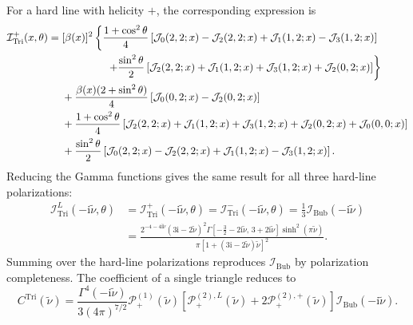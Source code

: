 \documentclass[a4paper,12pt]{article}
\def\ii{\mathrm{i}}
\begin{document}
For a hard line with helicity $+$, the corresponding expression is
\begin{align}
    \mathcal I^+_{\mathrm{Tri}}(x,\theta)
    ={}&[\beta(x)]^2\left\{
    \frac{1+\cos^2\theta}{4}\left[
    \mathcal J_0(2,2;x)-\mathcal J_2(2,2;x)
    +\mathcal J_1(1,2;x)-\mathcal J_3(1,2;x)\right]\right.
    \nonumber\\
    &\hspace{15mm}\left.+\frac{\sin^2\theta}{2}\left[
    \mathcal J_2(2,2;x)+\mathcal J_1(1,2;x)
    +\mathcal J_3(1,2;x)+\mathcal J_2(0,2;x)\right]\right\}
    \nonumber\\
    &+\frac{\beta(x)(2+\sin^2\theta)}4
    \left[\mathcal J_0(0,2;x)-\mathcal J_2(0,2;x)\right]
    \nonumber\\
    &+\frac{1+\cos^2\theta}{4}\left[
    \mathcal J_2(2,2;x)+\mathcal J_1(1,2;x)
    +\mathcal J_3(1,2;x)+\mathcal J_2(0,2;x)
    +\mathcal J_0(0,0;x)\right]
    \nonumber\\
    &+\frac{\sin^2\theta}{2}\left[
    \mathcal J_0(2,2;x)-\mathcal J_2(2,2;x)
    +\mathcal J_1(1,2;x)-\mathcal J_3(1,2;x)\right].
    \label{eq:triangle-IP-explicit}
\end{align}
Reducing the Gamma functions gives the same result for all three hard-line polarizations:
\begin{align}
    \mathcal I^L_{\mathrm{Tri}}(-\ii\tilde\nu,\theta)
    &=\mathcal I^+_{\mathrm{Tri}}(-\ii\tilde\nu,\theta)
    =\mathcal I^-_{\mathrm{Tri}}(-\ii\tilde\nu,\theta)
    =\frac13\mathcal I_{\mathrm{Bub}}(-\ii\tilde\nu)
    \nonumber\\
    &=\frac{2^{-4-4\ii\tilde\nu}(3\ii-2\tilde\nu)^2
    \Gamma[-\tfrac32-2\ii\tilde\nu,\,3+2\ii\tilde\nu]
    \sinh^2(\pi\tilde\nu)}
    {\pi[1+(3\ii-2\tilde\nu)\tilde\nu]^2}.
    \label{eq:triangle-I-closed}
\end{align}
Summing over the hard-line polarizations reproduces $\mathcal I_{\mathrm{Bub}}$ by polarization completeness.
The coefficient of a single triangle reduces to
\begin{equation}
    C^{\mathrm{Tri}}(\tilde\nu)
    =\frac{\Gamma^4(-\ii\tilde\nu)}{3(4\pi)^{7/2}}
    \mathcal P^{(1)}_{+}(\tilde\nu)
    \left[\mathcal P^{(2),L}_{+}(\tilde\nu)
    +2\mathcal P^{(2),+}_{+}(\tilde\nu)\right]
    \mathcal I_{\mathrm{Bub}}(-\ii\tilde\nu).
    \label{eq:triangle-C-reduced}
\end{equation}
\end{document}
